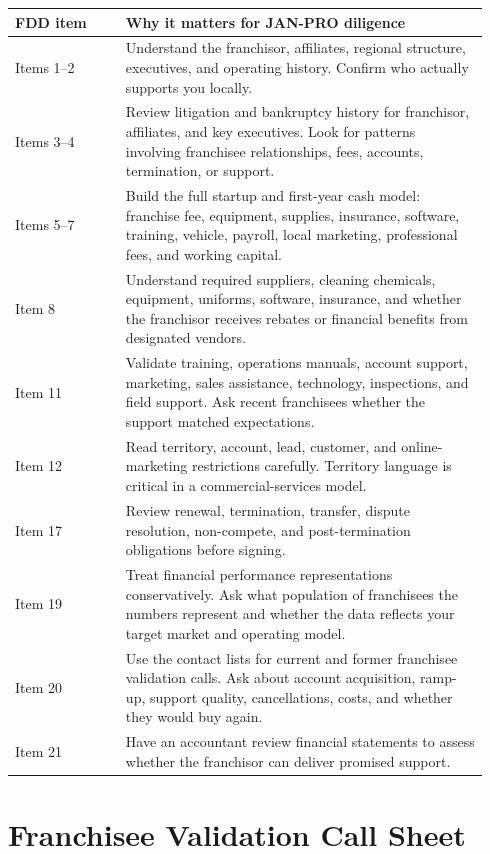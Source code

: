 \documentclass[11pt]{article}
\newcommand{\janpro}{JAN-PRO}
\begin{document}
\begin{longtable}{>{\raggedright\arraybackslash}p{0.22\linewidth}>{\raggedright\arraybackslash}p{0.72\linewidth}}
\toprule
\textbf{FDD item} & \textbf{Why it matters for \janpro{} diligence} \\
\midrule
Items 1--2 & Understand the franchisor, affiliates, regional structure, executives, and operating history. Confirm who actually supports you locally. \\
Items 3--4 & Review litigation and bankruptcy history for franchisor, affiliates, and key executives. Look for patterns involving franchisee relationships, fees, accounts, termination, or support. \\
Items 5--7 & Build the full startup and first-year cash model: franchise fee, equipment, supplies, insurance, software, training, vehicle, payroll, local marketing, professional fees, and working capital. \\
Item 8 & Understand required suppliers, cleaning chemicals, equipment, uniforms, software, insurance, and whether the franchisor receives rebates or financial benefits from designated vendors. \\
Item 11 & Validate training, operations manuals, account support, marketing, sales assistance, technology, inspections, and field support. Ask recent franchisees whether the support matched expectations. \\
Item 12 & Read territory, account, lead, customer, and online-marketing restrictions carefully. Territory language is critical in a commercial-services model. \\
Item 17 & Review renewal, termination, transfer, dispute resolution, non-compete, and post-termination obligations before signing. \\
Item 19 & Treat financial performance representations conservatively. Ask what population of franchisees the numbers represent and whether the data reflects your target market and operating model. \\
Item 20 & Use the contact lists for current and former franchisee validation calls. Ask about account acquisition, ramp-up, support quality, cancellations, costs, and whether they would buy again. \\
Item 21 & Have an accountant review financial statements to assess whether the franchisor can deliver promised support. \\
\bottomrule
\end{longtable}

\section{Franchisee Validation Call Sheet}
\end{document}
